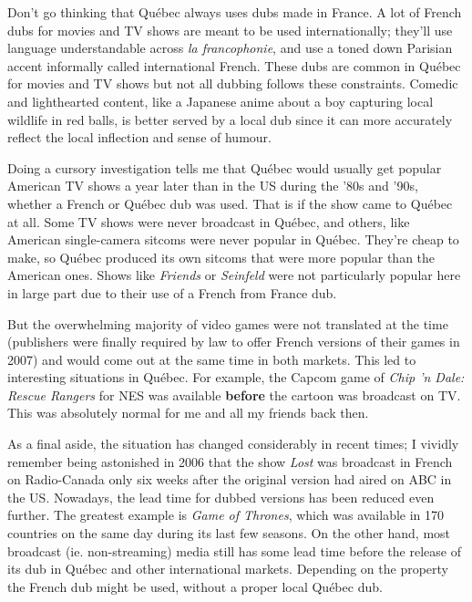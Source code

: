 \documentclass{book}
\begin{document}
Don’t go thinking that Québec always uses dubs made in France. A lot of French dubs for movies and TV shows are meant to be used internationally; they’ll use language understandable across \emph{la francophonie}, and use a toned down Parisian accent informally called international French. These dubs are common in Québec for movies and TV shows but not all dubbing follows these constraints. Comedic and lighthearted content, like a Japanese anime about a boy capturing local wildlife in red balls, is better served by a local dub since it can more accurately reflect the local inflection and sense of humour.

Doing a cursory investigation tells me that Québec would usually get popular American TV shows a year later than in the US during the ’80s and ’90s, whether a French or Québec dub was used. That is if the show came to Québec at all. Some TV shows were never broadcast in Québec, and others, like American single-camera sitcoms were never popular in Québec. They’re cheap to make, so Québec produced its own sitcoms that were more popular than the American ones. Shows like \emph{Friends} or \emph{Seinfeld} were not particularly popular here in large part due to their use of a French from France dub.

But the overwhelming majority of video games were not translated at the time (publishers were finally required by law to offer French versions of their games in 2007) and would come out at the same time in both markets. This led to interesting situations in Québec. For example, the Capcom game of \emph{Chip ’n Dale: Rescue Rangers} for NES was available \textbf{before} the cartoon was broadcast on TV. This was absolutely normal for me and all my friends back then.

As a final aside, the situation has changed considerably in recent times; I vividly remember being astonished in 2006 that the show \emph{Lost} was broadcast in French on Radio-Canada only six weeks after the original version had aired on ABC in the US. Nowadays, the lead time for dubbed versions has been reduced even further. The greatest example is \emph{Game of Thrones}, which was available in 170 countries on the same day during its last few seasons. On the other hand, most broadcast (ie. non-streaming) media still has some lead time before the release of its dub in Québec and other international markets. Depending on the property the French dub might be used, without a proper local Québec dub.
\end{document}
